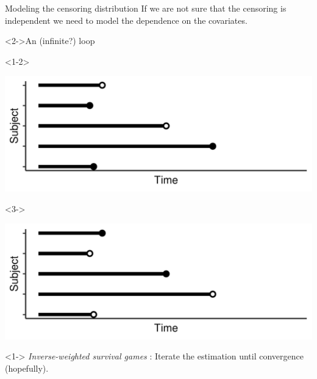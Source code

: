 \documentclass[smaller]{beamer}\usepackage{listings}
\begin{document}
\begin{frame}[label={sec:orgb4592fc}]{Modeling the censoring distribution}
\small If we are not sure that the censoring is independent we need to model the dependence on the
covariates. \vfill


\begin{block}<2->{\centering An (infinite?) loop}
\begin{onlyenv}<1-2>
\pause

\begin{center}
\includegraphics[width=.9\linewidth]{./fig-obs-data.pdf}
\end{center}
\end{onlyenv}

\begin{onlyenv}<3->
\begin{center}
\includegraphics[width=.9\linewidth]{./fig-inverse-data.pdf}
\end{center}
\end{onlyenv}
\end{block}


\begin{onlyenv}<1->
\pause \pause \emph{Inverse-weighted survival games} \citep{han2021inverse}: Iterate the estimation until
convergence (hopefully).
\end{onlyenv}
\end{frame}
\end{document}
